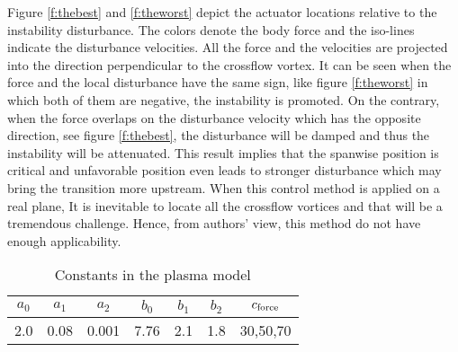\documentclass{AIAA}
\begin{document}
Figure \ref{f:thebest} and \ref{f:theworst} depict the actuator locations relative to the instability disturbance. The colors denote the body force and the iso-lines indicate the  disturbance velocities. All the force and the velocities are projected into the direction perpendicular to the crossflow vortex. It can be seen when the force and the local disturbance have the same sign, like figure \ref{f:theworst} in which both of them are negative, the instability is promoted. On the contrary, when the force overlaps on the disturbance velocity which has the opposite direction, see figure \ref{f:thebest}, the disturbance will be damped and thus the instability will be attenuated. This result implies that the spanwise position is critical and unfavorable position even leads to stronger disturbance which may bring the transition more upstream. When this control method is applied on a real plane, It is inevitable to locate all the crossflow vortices and that will be a tremendous challenge. Hence, from authors' view, this method do not have enough applicability.
\begin{table}
\caption{Constants in the plasma model}\label{t:constantsPmodel}
\begin{ruledtabular}
\begin{tabular}{ccccccc}
  $a_0$ & $a_1$ & $a_2$ & $b_0$ & $b_1$ & $b_2$ & $c_{\rm force}$ \\\hline
  2.0 & 0.08 & 0.001 & 7.76 & 2.1 & 1.8 & 30,50,70 \\
\end{tabular}
\end{ruledtabular}
\end{table}
\end{document}
